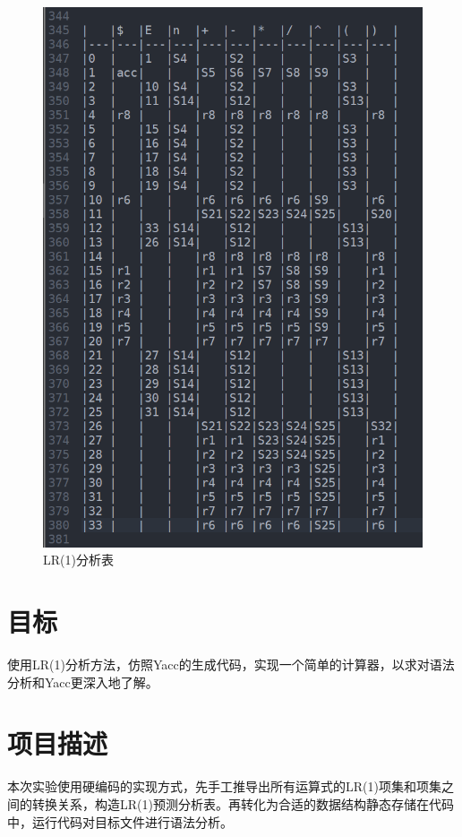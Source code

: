 \documentclass[a4paper]{ctexart} %
\begin{document}
	\begin{figure}[h]
		\centering
		\includegraphics[scale=0.5]{../picture/yacc/LR分析表.png}
		\caption[l]{LR(1)分析表}
	\end{figure}


	\newpage
	\section{目标}
	使用LR(1)分析方法，仿照Yacc的生成代码，实现一个简单的计算器，以求对语法分析和Yacc更深入地了解。

	\section{项目描述}
	本次实验使用硬编码的实现方式，先手工推导出所有运算式的LR(1)项集和项集之间的转换关系，构造LR(1)预测分析表。再转化为合适的数据结构静态存储在代码中，运行代码对目标文件进行语法分析。
\end{document}
